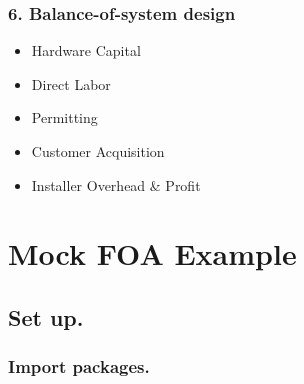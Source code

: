 \documentclass[letterpaper,10pt,english]{sphinxmanual}
\begin{document}
\subsection{6. Balance-of-system design}
\label{\detokenize{doc-src/mock-foa:balance-of-system-design}}\begin{itemize}
\item {} 
Hardware Capital

\item {} 
Direct Labor

\item {} 
Permitting

\item {} 
Customer Acquisition

\item {} 
Installer Overhead \& Profit

\end{itemize}


\chapter{Mock FOA Example}
\label{\detokenize{doc-src/ioc-1:mock-foa-example}}\label{\detokenize{doc-src/ioc-1::doc}}

\section{Set up.}
\label{\detokenize{doc-src/ioc-1:set-up}}

\subsection{Import packages.}
\label{\detokenize{doc-src/ioc-1:import-packages}}
\begin{sphinxVerbatim}[commandchars=\\\{\}]
 
 
 
\end{sphinxVerbatim}

\begin{sphinxVerbatim}[commandchars=\\\{\}]
               
   
              
             
               

              
   
\end{sphinxVerbatim}
\end{document}
